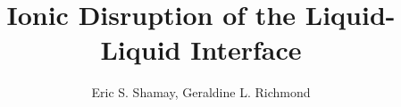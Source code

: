 \documentclass[12pt]{article}
\title{Ionic Disruption of the Liquid-Liquid Interface}
\author{Eric S. Shamay, Geraldine L. Richmond}
\begin{document}
\maketitle


\newcommand{\ang}{\,$\textrm{\AA}$}
\newcommand{\angs}{\ang}
\newcommand{\wat}{H$_2$O}
\newcommand{\ctc}{CCl$_4$}
\newcommand{\ctcwat}{CCl$_4$-H$_2$O}
\newcommand{\airwat}{air-H$_2$O}
\newcommand{\cl}{Cl$^-$}
\newcommand{\nit}{${\text{NO}_3}^-$}
\newcommand{\sul}{${\text{SO}_4}^{2-}$}
\newcommand{\nacl}{NaCl}
\newcommand{\sodnit}{NaNO$_3$}
\newcommand{\sodsul}{Na$_2$SO$_4$}
\newcommand{\costheta}{$\cos\theta$~}
\newcommand{\cosphi}{$\cos\phi$~}
\newcommand{\costhetarange}{~$<\cos\theta<$~}
\newcommand{\cosphirange}{~$<\cos\phi<$~}
\newcommand{\cm}{\,$cm^{-1}$}

\doublespacing

%










%







%
\end{document}

